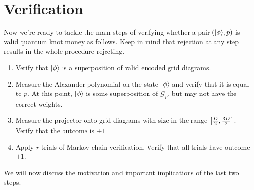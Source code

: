 \section{Verification}

Now we're ready to tackle 
the main steps of verifying whether a pair $(|\phi \rangle,p)$ is valid
quantum knot money as follows. Keep in mind that
rejection at any step results in
the whole procedure rejecting.

\begin{enumerate}
\item
Verify that $|\phi \rangle$ is a superposition of valid encoded grid diagrams.
\item
Measure the Alexander polynomial on the state $|\phi \rangle$ and verify
that it is equal to $p$.
At this point, $|\phi \rangle$ is some superposition of
$\mathcal{G}_p$, but may not have the correct weights.
\item
Measure the projector onto grid diagrams with size in the range
$\left[ \tfrac{D}{2}, \tfrac{3D}{2} \right]$.
Verify that the outcome is $+1$.
\item
Apply $r$ trials of
Markov chain verification. Verify that all trials have outcome $+1$.
\end{enumerate}

We will now discuss the motivation and important implications of the
last two steps.

